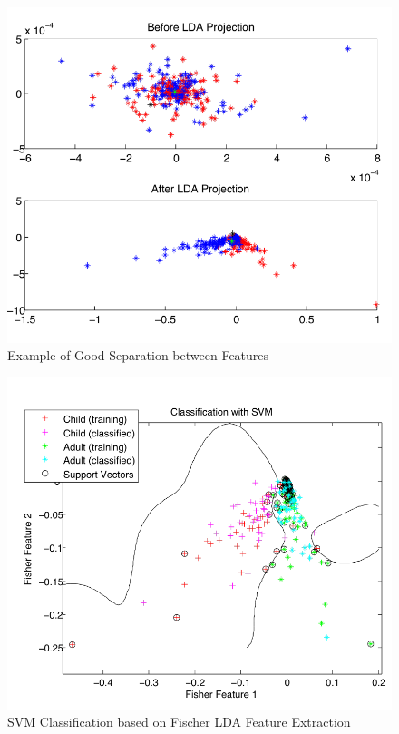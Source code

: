 \documentclass{article}[11pt]
\begin{document}
\begin{figure}[H]
\centering
\includegraphics[scale = 0.6]{Images/AdultChild_LDA_goodplot.pdf}
\caption{Example of Good Separation between Features}
\label{fig:ACLDA}
\end{figure}

\begin{figure}[H]
\centering
\includegraphics[scale = 0.6]{Images/AdultChild_SVM.pdf}
\caption{SVM Classification based on Fischer LDA Feature Extraction}
\label{fig:ACSVM}
\end{figure}
\end{document}
